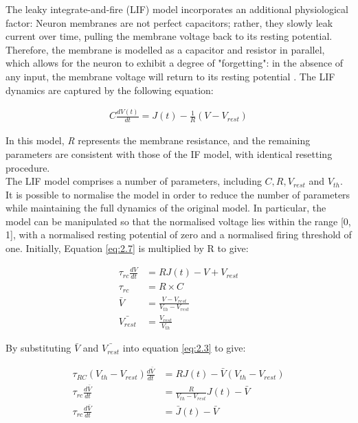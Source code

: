\noindent The leaky integrate-and-fire (LIF) model \cite{knight1972dynamics} incorporates an additional physiological factor: Neuron membranes are not perfect capacitors; rather, they slowly leak current over time, pulling the membrane voltage back to its resting potential. Therefore, the membrane is modelled as a capacitor and resistor in parallel, which allows for the neuron to exhibit a degree of "forgetting": in the absence of any input, the membrane voltage will return to its resting potential \cite{koch2004biophysics}. The LIF dynamics are captured by the following equation:

\begin{align}
C \frac{dV(t)}{dt} = J(t) - \frac{1}{R} (V - V_{rest}) \label{eq:2.7} 
\end{align}

\noindent In this model, \textit{R} represents the membrane resistance, and the remaining parameters are consistent with those of the IF model, with identical resetting procedure.\\

\noindent The LIF model comprises a number of parameters, including $C, R, V_{rest}$ and $V_{th}$. It is possible to normalise the model in order to reduce the number of parameters while maintaining the full dynamics of the original model. In particular, the model can be manipulated so that the normalised voltage lies within the range [0, 1], with a normalised resting potential of zero and a normalised firing threshold of one. Initially, Equation \ref{eq:2.7} is multiplied by R to give:

\begin{align}
    \tau_{rc} \frac{dV}{dt} &= RJ(t) - V + V_{rest} \label{eq:2.8} \\
    \tau_{rc} &= R \times C \label{eq:2.9} \\
    \bar{V} &= \frac{V - V_{rest}}{V_{th} - V_{rest}} \label{eq:2.10} \\
    \bar{V_{rest}} &= \frac{V_{rest}}{V_{th}} \label{eq:2.11} 
\end{align}

\noindent By substituting $\bar{V}$ and $\bar{V_{rest}}$ into equation \ref{eq:2.3} to give:


\begin{align}
    \tau_{RC}(V_{th} - V_{rest})\frac{d\bar{V}}{dt} &= RJ(t) - \bar{V}(V_{th} - V_{rest})
    \label{eq:2.12} \\
    \tau_{rc}\frac{d\bar{V}}{dt} &= \frac{R}{V_{th} - V_{rest}} J(t) - \bar{V} \label{eq:2.13} \\
    \tau_{rc} \frac{d\bar{V}}{dt} &= \bar{J}(t) - \bar{V} \label{eq:2.14} 
\end{align}

